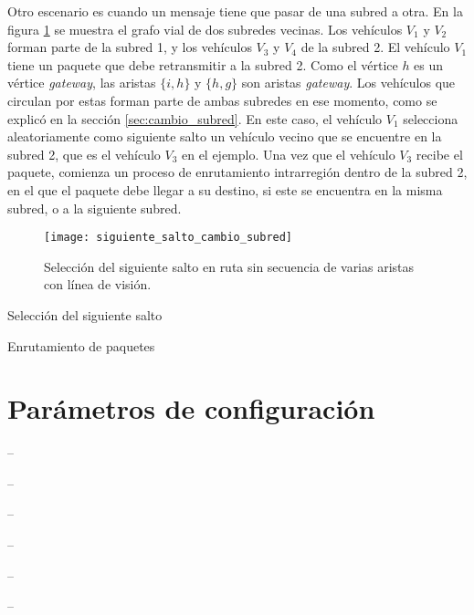 Otro escenario es cuando un mensaje tiene que pasar de una subred a otra. En la
figura \ref{fig:siguiente_salto_cambio_subred} se muestra el grafo vial de dos
subredes vecinas. Los vehículos $V_1$ y $V_2$ forman parte de la subred 1, y
los vehículos $V_3$ y $V_4$ de la subred 2. El vehículo $V_1$ tiene un paquete
que debe retransmitir a la subred 2. Como el vértice $h$ es un vértice
\textit{gateway}, las aristas $\{i,h\}$ y $\{h,g\}$ son aristas
\textit{gateway}. Los vehículos que circulan por estas forman parte de ambas
subredes en ese momento, como se explicó en la sección \ref{sec:cambio_subred}.
En este caso, el vehículo $V_1$ selecciona aleatoriamente como siguiente salto
un vehículo vecino que se encuentre en la subred 2, que es el vehículo $V_3$ en
el ejemplo. Una vez que el vehículo $V_3$ recibe el paquete, comienza un
proceso de enrutamiento intrarregión dentro de la subred 2, en el que el paquete
debe llegar a su destino, si este se encuentra en la misma subred, o a la
siguiente subred.

\begin{figure}[th!]
\centering
\texttt{[image: siguiente\_salto\_cambio\_subred]}
\decoRule
\caption[Selección del siguiente salto en ruta sin secuencia de varias aristas
con línea de visión]{Selección del siguiente salto en ruta sin secuencia de
varias aristas con línea de visión.}
\label{fig:siguiente_salto_cambio_subred}
\end{figure}

\begin{algorithm}[th!]
\small
\caption{Selección del siguiente salto}
\label{alg:seleccion_siguiente_salto}
\DontPrintSemicolon
\LinesNumbered
    \Begin{
        
    }
\end{algorithm}

\begin{algorithm}[th!]
\small
\caption{Enrutamiento de paquetes}
\label{alg:enrutar_paquete}
\DontPrintSemicolon
\LinesNumbered
\end{algorithm}

\section{Parámetros de configuración}
\label{sec:parametros_configuracion}

 --

 --

 --

 --

 --

 --
